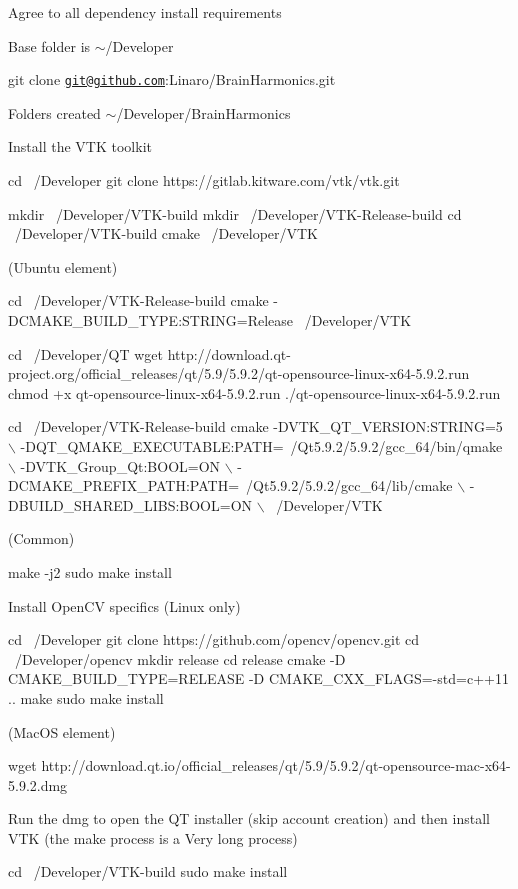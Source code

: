 Agree to all dependency install requirements

Base folder is $\sim$/\+Developer

git clone \href{mailto:git@github.com}{\tt git@github.\+com}\+:Linaro/\+Brain\+Harmonics.\+git

Folders created $\sim$/\+Developer/\+Brain\+Harmonics

Install the V\+TK toolkit


\begin{DoxyCode}
cd ~/Developer
git clone https://gitlab.kitware.com/vtk/vtk.git

mkdir ~/Developer/VTK-build
mkdir ~/Developer/VTK-Release-build
cd ~/Developer/VTK-build
cmake ~/Developer/VTK
\end{DoxyCode}
 (Ubuntu element) 
\begin{DoxyCode}
cd ~/Developer/VTK-Release-build
cmake -DCMAKE\_BUILD\_TYPE:STRING=Release ~/Developer/VTK

cd ~/Developer/QT
wget http://download.qt-project.org/official\_releases/qt/5.9/5.9.2/qt-opensource-linux-x64-5.9.2.run
chmod +x qt-opensource-linux-x64-5.9.2.run
./qt-opensource-linux-x64-5.9.2.run

cd ~/Developer/VTK-Release-build
cmake -DVTK\_QT\_VERSION:STRING=5 \(\backslash\)
      -DQT\_QMAKE\_EXECUTABLE:PATH=~/Qt5.9.2/5.9.2/gcc\_64/bin/qmake \(\backslash\)
      -DVTK\_Group\_Qt:BOOL=ON \(\backslash\)
      -DCMAKE\_PREFIX\_PATH:PATH=~/Qt5.9.2/5.9.2/gcc\_64/lib/cmake  \(\backslash\)
      -DBUILD\_SHARED\_LIBS:BOOL=ON \(\backslash\)
      ~/Developer/VTK
\end{DoxyCode}
 (Common) 
\begin{DoxyCode}
make -j2
sudo make install
\end{DoxyCode}


Install Open\+CV specifics (Linux only) 
\begin{DoxyCode}
cd ~/Developer
git clone https://github.com/opencv/opencv.git
cd ~/Developer/opencv
mkdir release
cd release
cmake -D CMAKE\_BUILD\_TYPE=RELEASE -D CMAKE\_CXX\_FLAGS=-std=c++11 ..
make
sudo make install
\end{DoxyCode}


(Mac\+OS element) 
\begin{DoxyCode}
wget http://download.qt.io/official\_releases/qt/5.9/5.9.2/qt-opensource-mac-x64-5.9.2.dmg
\end{DoxyCode}
 Run the dmg to open the QT installer (skip account creation) and then install V\+TK (the make process is a Very long process) 
\begin{DoxyCode}
cd ~/Developer/VTK-build
sudo make install
\end{DoxyCode}


